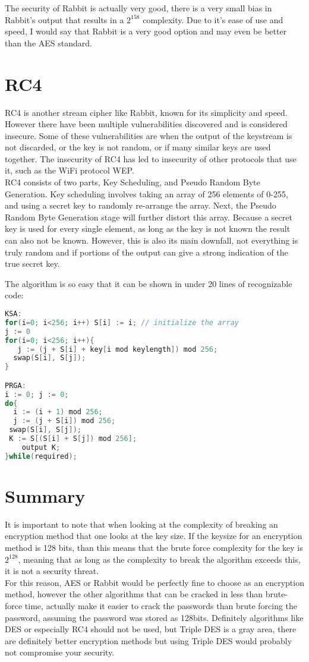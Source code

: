 \documentclass[a4paper, 11pt]{article}
\begin{document}
The security of Rabbit is actually very good, there is a very small bias in Rabbit's output that results in a $2^{158}$ complexity. Due to it's ease of use and speed, I would say that Rabbit is a very good option and may even be better than the AES standard.

\section*{RC4}
RC4 is another stream cipher like Rabbit, known for its simplicity and speed.  However there have been multiple vulnerabilities discovered and is considered insecure.  Some of these vulnerabilities are when the output of the keystream is not discarded, or the key is not random, or if many similar keys are used together.  The insecurity of RC4 has led to insecurity of other protocols that use it, such as the WiFi protocol WEP.\\

RC4 consists of two parts, Key Scheduling, and Pseudo Random Byte Generation.  Key scheduling involves taking an array of 256 elements of 0-255, and using a secret key to randomly re-arrange the array.  Next, the Pseudo Random Byte Generation stage will further distort this array.  Because a secret key is used for every single element, as long as the key is not known the result can also not be known.  However, this is also its main downfall, not everything is truly random and if portions of the output can give a strong indication of the true secret key.

The algorithm is so easy that it can be shown in under 20 lines of recognizable code:\\
\begin{lstlisting}[language=C]
KSA:
for(i=0; i<256; i++) S[i] := i; // initialize the array
j := 0
for(i=0; i<256; i++){
   j := (j + S[i] + key[i mod keylength]) mod 256;
  swap(S[i], S[j]);
}

PRGA:
i := 0; j := 0;
do{
  i := (i + 1) mod 256;
  j := (j + S[i]) mod 256;
 swap(S[i], S[j]);
 K := S[(S[i] + S[j]) mod 256];
    output K;
}while(required);
\end{lstlisting}


\section*{Summary}
It is important to note that when looking at the complexity of breaking an encryption method that one looks at the key size.  If the keysize for an encryption method is 128 bits, than this means that the brute force complexity for the key is $2^{128}$, meaning that as long as the complexity to break the algorithm exceeds this, it is not a security threat.\\

For this reason, AES or Rabbit would be perfectly fine to choose as an encryption method, however the other algorithms that can be cracked in less than brute-force time, actually make it easier to crack the passwords than brute forcing the password, assuming the password was stored as 128bits. Definitely algorithms like DES or especially RC4 should not be used, but Triple DES is a gray area, there are definitely better encryption methods but using Triple DES would probably not compromise your security.
\end{document}
